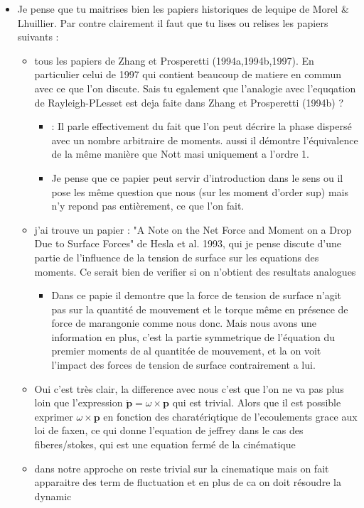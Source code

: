 \documentclass[12pt]{My_preprint}
\newcommand{\JL}[1]{\color{red}#1\color{black}}
\newcommand{\tb}[1]{\color{blue}#1\color{black}}
\renewcommand{\JL}[1]{}
\begin{document}
{\begin{itemize}
\item Je pense que tu maitrises bien les papiers historiques de lequipe de Morel $\&$ Lhuillier. Par contre clairement il faut que tu lises ou relises les papiers suivants : 
\begin{itemize}
\item tous les papiers de Zhang et Prosperetti (1994a,1994b,1997). En particulier celui de 1997 qui contient beaucoup de matiere en commun avec ce que l'on discute. Sais tu egalement que l'analogie avec l'equqation de Rayleigh-PLesset est deja faite dans Zhang et Prosperetti (1994b) ?
\tb{
    \begin{itemize}
        \item \citet{zhang1997momentum} : Il parle effectivement du fait que l'on peut décrire la phase dispersé avec un nombre arbitraire de moments. aussi il démontre l'équivalence de la même manière que Nott masi uniquement a l'ordre 1. 
        \item Je pense que ce papier peut servir d'introduction dans le sens ou il pose les même question que nous (sur les moment d'order sup) mais n'y repond pas entièrement, ce que l'on fait. 
    \end{itemize}
}
    \item j'ai trouve un papier : "A Note on the Net Force and Moment on a Drop Due to Surface Forces" de Hesla et al. 1993, qui je pense discute d'une partie de l'influence de la tension de surface sur les equations des moments. Ce serait bien de verifier si on n'obtient des resultats analogues
    
\begin{itemize}
    \item 
    \tb{Dans ce papie il demontre que la force de tension de surface n'agit pas sur la quantité de mouvement et le torque même en présence de force de marangonie comme nous donc. 
    Mais nous avons une information en plus, c'est la partie symmetrique de l'équation du premier moments de al quantitée de mouvement, et la on voit l'impact des forces de tension de surface contrairement a lui. }
\end{itemize}
    \JL{\item concernant le tranport de $<pipj>$ le papier le plus claire il me semble est celui de Wang $\&$ Tucker 2008.}
    \tb{
        \item Oui c'est très clair, la difference avec nous c'est que l'on ne va pas plus loin que l'expression $\dot{\textbf{p}} = \omega \times \textbf{p}$ qui est trivial.
        Alors que il est possible exprimer $ \omega\times\textbf{p} $ en fonction des charatériqtique de l'ecoulements grace aux loi de faxen, ce qui donne l'equation de jeffrey dans le cas des fiberes/stokes, qui est une equation fermé de la cinématique 
        \item  dans notre approche on reste trivial sur la cinematique mais on fait apparaitre des term de fluctuation et en plus de ca on doit résoudre la dynamic 
        }
\end{itemize}
\end{itemize}
}
\end{document}
